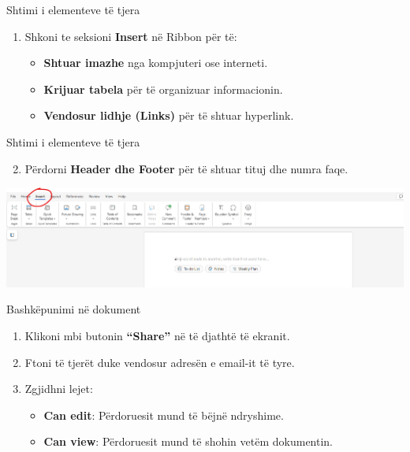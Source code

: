 \documentclass[
  ignorenonframetext,
]{beamer}
\providecommand{\tightlist}{%
  \setlength{\itemsep}{0pt}\setlength{\parskip}{0pt}}
\begin{document}
\begin{frame}{Shtimi i elementeve të tjera}
\label{shtimi-i-elementeve-tuxeb-tjera}
\begin{enumerate}
\item
  Shkoni te seksioni \textbf{Insert} në Ribbon për të:

  \begin{itemize}
  \item
    \textbf{Shtuar imazhe} nga kompjuteri ose interneti.
  \item
    \textbf{Krijuar tabela} për të organizuar informacionin.
  \item
    \textbf{Vendosur lidhje (Links)} për të shtuar hyperlink.
  \end{itemize}
\end{enumerate}
\end{frame}

\begin{frame}{Shtimi i elementeve të tjera}
\label{shtimi-i-elementeve-tuxeb-tjera-1}
\begin{enumerate}
\setcounter{enumi}{1}
\tightlist
\item
  Përdorni \textbf{Header dhe Footer} për të shtuar tituj dhe numra
  faqe.
\end{enumerate}

\includegraphics{./images/word5.png}
\end{frame}

\begin{frame}{Bashkëpunimi në dokument}
\label{bashkuxebpunimi-nuxeb-dokument}
\begin{enumerate}
\item
  Klikoni mbi butonin \textbf{``Share''} në të djathtë të ekranit.
\item
  Ftoni të tjerët duke vendosur adresën e email-it të tyre.
\item
  Zgjidhni lejet:

  \begin{itemize}
  \item
    \textbf{Can edit}: Përdoruesit mund të bëjnë ndryshime.
  \item
    \textbf{Can view}: Përdoruesit mund të shohin vetëm dokumentin.
  \end{itemize}
\end{enumerate}
\end{frame}
\end{document}
